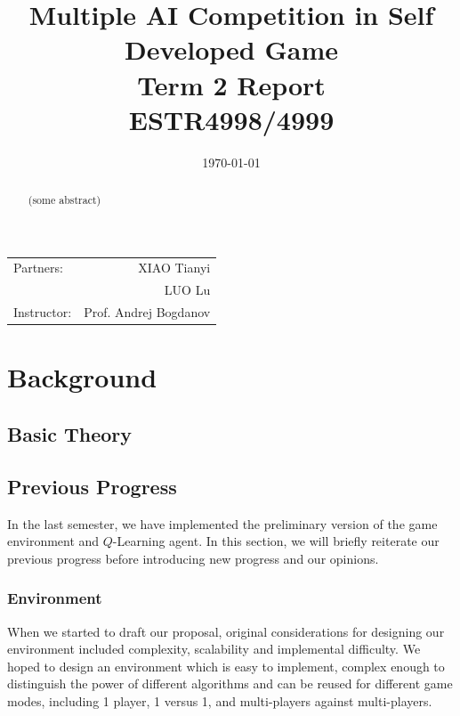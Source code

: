 \documentclass[12pt]{article}
\title{\large Multiple AI Competition in Self Developed Game \\ Term 2 Report \\ ESTR4998/4999} %
\date{\today} %
\begin{document}
\maketitle %

\begin{center}
\begin{tabular}{l r}
Partners: & XIAO Tianyi \\ %
& LUO Lu \\
Instructor: & Prof. Andrej Bogdanov %
\end{tabular}
\end{center}
\newpage



\begin{abstract}
	(some abstract)
\end{abstract}
 
\section{Background}

\subsection{Basic Theory}

\subsection{Previous Progress}
In the last semester, we have implemented the preliminary version of the game environment and $Q$-Learning agent. In this section, we will briefly reiterate our previous progress before introducing new progress and our opinions.
\subsubsection{Environment}
When we started to draft our proposal, original considerations for designing our environment included complexity, scalability and implemental difficulty. We hoped to design an environment which is easy to implement, complex enough to distinguish the power of different algorithms and can be reused for different game modes, including 1 player, 1 versus 1, and multi-players against multi-players.
\end{document}
